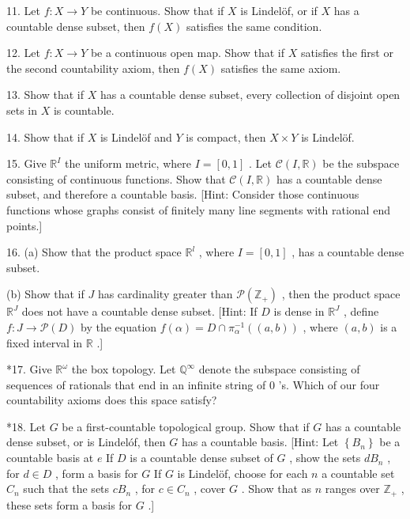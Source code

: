 \documentclass[10pt]{article}
\begin{document}
11. Let \(f : X \rightarrow  Y\) be continuous. Show that if \(X\) is Lindelöf, or if \(X\) has a countable dense subset, then \(f\left( X\right)\) satisfies the same condition.

12. Let \(f : X \rightarrow  Y\) be a continuous open map. Show that if \(X\) satisfies the first or the second countability axiom, then \(f\left( X\right)\) satisfies the same axiom.

13. Show that if \(X\) has a countable dense subset, every collection of disjoint open sets in \(X\) is countable.

14. Show that if \(X\) is Lindelöf and \(Y\) is compact, then \(X \times  Y\) is Lindelöf.

15. Give \({\mathbb{R}}^{I}\) the uniform metric, where \(I = \left\lbrack  {0,1}\right\rbrack\) . Let \(\mathcal{C}\left( {I,\mathbb{R}}\right)\) be the subspace consisting of continuous functions. Show that \(\mathcal{C}\left( {I,\mathbb{R}}\right)\) has a countable dense subset, and therefore a countable basis. [Hint: Consider those continuous functions whose graphs consist of finitely many line segments with rational end points.]

16. (a) Show that the product space \({\mathbb{R}}^{l}\) , where \(I = \left\lbrack  {0,1}\right\rbrack\) , has a countable dense subset.

(b) Show that if \(J\) has cardinality greater than \(\mathcal{P}\left( {\mathbb{Z}}_{ + }\right)\) , then the product space \({\mathbb{R}}^{J}\) does not have a countable dense subset. [Hint: If \(D\) is dense in \({\mathbb{R}}^{J}\) , define \(f : J \rightarrow  \mathcal{P}\left( D\right)\) by the equation \(f\left( \alpha \right)  = D \cap  {\pi }_{\alpha }^{-1}\left( \left( {a,b}\right) \right)\) , where \(\left( {a,b}\right)\) is a fixed interval in \(\mathbb{R}\) .]

*17. Give \({\mathbb{R}}^{\omega }\) the box topology. Let \({\mathbb{Q}}^{\infty }\) denote the subspace consisting of sequences of rationals that end in an infinite string of 0 's. Which of our four countability axioms does this space satisfy?

*18. Let \(G\) be a first-countable topological group. Show that if \(G\) has a countable dense subset, or is Lindelóf, then \(G\) has a countable basis. [Hint: Let \(\left\{  {B}_{n}\right\}\) be a countable basis at \(e\) If \(D\) is a countable dense subset of \(G\) , show the sets \(d{B}_{n}\) , for \(d \in  D\) , form a basis for \(G\) If \(G\) is Lindelöf, choose for each \(n\) a countable set \({C}_{n}\) such that the sets \(c{B}_{n}\) , for \(c \in  {C}_{n}\) , cover \(G\) . Show that as \(n\) ranges over \({\mathbb{Z}}_{ + }\) , these sets form a basis for \(G\) .]
\end{document}
